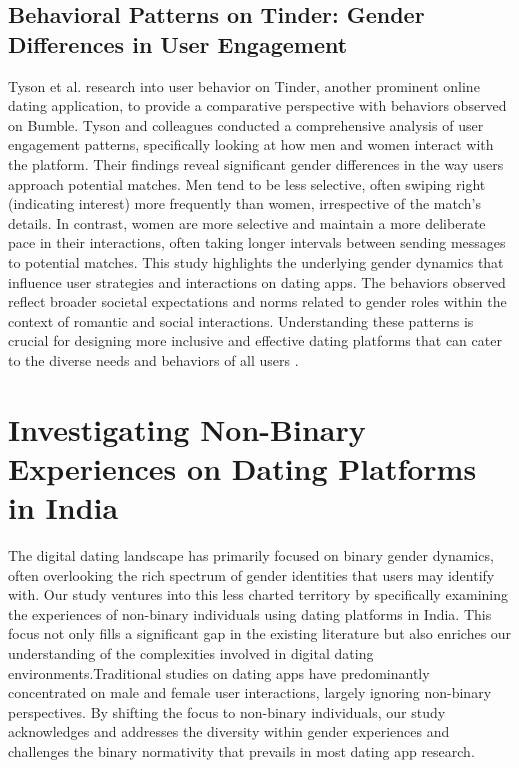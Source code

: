 \subsection{Behavioral Patterns on Tinder: Gender Differences in User Engagement}
Tyson et al. research into user behavior on Tinder, another prominent online dating application, to provide a comparative perspective with behaviors observed on Bumble. Tyson and colleagues conducted a comprehensive analysis of user engagement patterns, specifically looking at how men and women interact with the platform. Their findings reveal significant gender differences in the way users approach potential matches. Men tend to be less selective, often swiping right (indicating interest) more frequently than women, irrespective of the match's details. In contrast, women are more selective and maintain a more deliberate pace in their interactions, often taking longer intervals between sending messages to potential matches. This study highlights the underlying gender dynamics that influence user strategies and interactions on dating apps. The behaviors observed reflect broader societal expectations and norms related to gender roles within the context of romantic and social interactions. Understanding these patterns is crucial for designing more inclusive and effective dating platforms that can cater to the diverse needs and behaviors of all users \cite{Tyson_Perta_Haddadi_Seto_2016}.

\section{Investigating Non-Binary Experiences on Dating Platforms in India}
The digital dating landscape has primarily focused on binary gender dynamics, often overlooking the rich spectrum of gender identities that users may identify with. Our study ventures into this less charted territory by specifically examining the experiences of non-binary individuals using dating platforms in India. This focus not only fills a significant gap in the existing literature but also enriches our understanding of the complexities involved in digital dating environments.Traditional studies on dating apps have predominantly concentrated on male and female user interactions, largely ignoring non-binary perspectives. By shifting the focus to non-binary individuals, our study acknowledges and addresses the diversity within gender experiences and challenges the binary normativity that prevails in most dating app research. 

